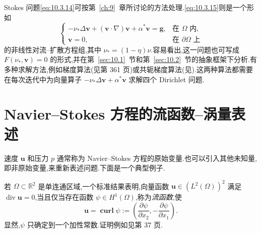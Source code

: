 Stokes 问题\eqref{eq:10.3.14}可按第~\ref{ch:9}~章所讨论的方法处理.\eqref{eq:10.3.15}则是一个形如
\begin{equation}\label{eq:10.3.16}
  \begin{cases}
    -\nu_*\Delta\boldsymbol{v}+(\boldsymbol{v}\cdot\nabla)\boldsymbol{v}+\alpha^*\boldsymbol{v}
       =\boldsymbol{g},&\text{在 }\Omega\text{ 内},\\
    \boldsymbol{v}=0,&\text{在 }\partial\Omega\text{ 上}
  \end{cases}
\end{equation}
的非线性对流--扩散方程组,其中 \(\nu_*=(1-\eta)\nu\).容易看出,这一问题也可写成 \(F(\nu_*,\boldsymbol{v})=0\) 的形式,并在第~\ref{sec:10.1}~节和第~\ref{sec:10.2}~节的抽象框架下分析.有多种求解方法,例如梯度算法(见第 361 页)或共轭梯度算法(见).这两种算法都需要在每次迭代中为向量算子 \(-\nu_*\Delta\boldsymbol{v}+\alpha^*\boldsymbol{v}\) 求解四个 Dirichlet 问题.

\section{Navier--Stokes 方程的流函数--涡量表述}\label{sec:10.4}

速度 \(\boldsymbol{u}\) 和压力 \(p\) 通常称为 Navier--Stokes 方程的原始变量.也可以引入其他未知量,即非原始变量,来重新表述问题.下面是一个典型例子.

若 \(\Omega\subset\mathbb R^2\) 是单连通区域,一个标准结果表明,向量函数 \(\boldsymbol{u}\in(L^2(\Omega))^2\) 满足 \(\operatorname{div}\boldsymbol{u}=0\),当且仅当存在函数 \(\psi\in H^1(\Omega)\),称为\emph{流函数},使
\begin{equation}\label{eq:10.4.1}
  \boldsymbol{u}=\operatorname{\mathbf{curl}}\psi
    :=\left(\frac{\partial\psi}{\partial x_2},-\frac{\partial\psi}{\partial x_1}\right).
\end{equation}
显然,\(\psi\) 只确定到一个加性常数.证明例如见第 37 页.

